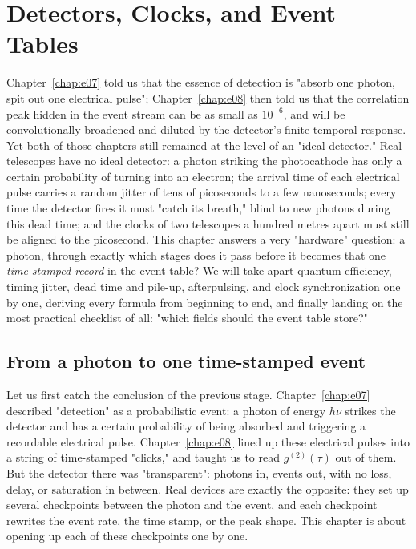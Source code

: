 \chapter{Detectors, Clocks, and Event Tables}
\label{chap:e13}

\begin{chapteropening}
Chapter~\ref{chap:e07} told us that the essence of detection is "absorb one photon, spit out one electrical pulse"; Chapter~\ref{chap:e08} then told us that the correlation peak hidden in the event stream can be as small as $10^{-6}$, and will be convolutionally broadened and diluted by the detector's finite temporal response. Yet both of those chapters still remained at the level of an "ideal detector." Real telescopes have no ideal detector: a photon striking the photocathode has only a certain probability of turning into an electron; the arrival time of each electrical pulse carries a random jitter of tens of picoseconds to a few nanoseconds; every time the detector fires it must "catch its breath," blind to new photons during this dead time; and the clocks of two telescopes a hundred metres apart must still be aligned to the picosecond. This chapter answers a very "hardware" question: a photon, through exactly which stages does it pass before it becomes that one \emph{time-stamped record} in the event table? We will take apart quantum efficiency, timing jitter, dead time and pile-up, afterpulsing, and clock synchronization one by one, deriving every formula from beginning to end, and finally landing on the most practical checklist of all: "which fields should the event table store?"
\end{chapteropening}

\section{From a photon to one time-stamped event}
\label{sec:e13-from-photon-to-event}

Let us first catch the conclusion of the previous stage. Chapter~\ref{chap:e07} described "detection" as a probabilistic event: a photon of energy $h\nu$ strikes the detector and has a certain probability of being absorbed and triggering a recordable electrical pulse. Chapter~\ref{chap:e08} lined up these electrical pulses into a string of time-stamped "clicks," and taught us to read $g^{(2)}(\tau)$ out of them. But the detector there was "transparent": photons in, events out, with no loss, delay, or saturation in between. Real devices are exactly the opposite: they set up several checkpoints between the photon and the event, and each checkpoint rewrites the event rate, the time stamp, or the peak shape. This chapter is about opening up each of these checkpoints one by one.

